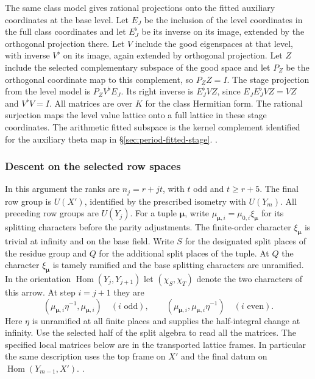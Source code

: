 The same class model gives rational projections
onto the fitted auxiliary coordinates at the base level. Let \(E_J\)
be the inclusion of the level coordinates in the full class
coordinates and let \(E_J^\flat\) be its inverse on its image,
extended by the orthogonal projection there. Let \(V\) include
the good eigenspaces at that level, with inverse \(V^\flat\) on
its image, again extended by orthogonal projection. Let \(Z\)
include the selected complementary subspace of the good space
and let \(P_Z\) be the orthogonal coordinate map to this
complement, so \(P_Z Z=I\). The stage projection from the level
model is \(P_ZV^\flat E_J\). Its right inverse is
\(E_J^\flat VZ\), since \(E_J E_J^\flat VZ=VZ\) and
\(V^\flat V=I\). All matrices are over \(K\) for the class
Hermitian form. The rational surjection maps the level value
lattice onto a full lattice in these stage coordinates.
The arithmetic fitted subspace is the kernel complement
identified for the auxiliary theta map in
\S\ref{sec:period-fitted-stage}.
.

\subsubsection{Descent on the selected row spaces}\label{sec:period-selected-row-cuts}
In this argument the ranks are \(n_j=r+jt\), with
\(t\) odd and \(t\ge r+5\). The final row group is
\(U(X')\), identified by the prescribed isometry with
\(U(Y_m)\). All preceding row groups are \(U(Y_j)\).
For a tuple \(\boldsymbol\mu\), write
\(\mu_{\boldsymbol\mu,i}=\mu_{0,i}\xi_{\boldsymbol\mu}\)
for its splitting characters before the parity adjustments.
The finite-order character \(\xi_{\boldsymbol\mu}\) is trivial
at infinity and on the base field. Write \(S\) for the
designated split places of the residue group and \(Q\)
for the additional split places of the tuple. At \(Q\) the
character \(\xi_{\boldsymbol\mu}\) is tamely ramified and
the base splitting characters are unramified. In the
orientation \(\operatorname{Hom}(Y_j,Y_{j+1})\) let
\((\chi_S,\chi_T)\) denote the two characters of this arrow.
At step \(i=j+1\) they are
\[
 (\mu_{\boldsymbol\mu,i}\eta^{-1},\mu_{\boldsymbol\mu,i})
 \quad(i\text{ odd}),\qquad
 (\mu_{\boldsymbol\mu,i},\mu_{\boldsymbol\mu,i}\eta^{-1})
 \quad(i\text{ even}).
\]
Here \(\eta\) is unramified at all finite places and supplies
the half-integral change at infinity. Use the selected
half of the split algebra to read all the matrices. The
specified local matrices below are in the transported
lattice frames. In particular the same description uses
the top frame on \(X'\) and the final datum on
\(\operatorname{Hom}(Y_{m-1},X')\).
.

